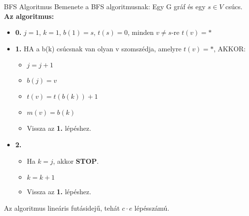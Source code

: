\begin{tetel}{BFS Algoritmus}
Bemenete a BFS algoritmusnak: Egy G gráf és egy $s \in V$ csúcs.
\\
\textbf{Az algoritmus:}
\begin{itemize}
\item{\textbf{0.}} $j = 1$, $k = 1$, $b(1) = s$, $t(s) = 0$, minden $v \neq s$-re $t(v) = *$
\item{\textbf{1.}} HA a b(k) csúcsnak van olyan v szomszédja, amelyre $t(v) = *$, AKKOR:
	\begin{itemize}
	\item $j = j + 1$
	\item $b(j) = v$
	\item $t(v) = t(b(k)) + 1$
	\item $m(v) = b(k)$
	\item Vissza az \textbf{1.} lépéshez.
	\end{itemize}
\item{\textbf{2.}}
	\begin{itemize}
	\item Ha $k = j$, akkor \textbf{STOP}.
	\item $k = k + 1$
	\item Vissza az \textbf{1.} lépéshez.
	\end{itemize}
  \end{itemize}


%       


Az algoritmus lineáris futásidejű, tehát $c \cdot e$ lépésszámú.

\end{tetel}

